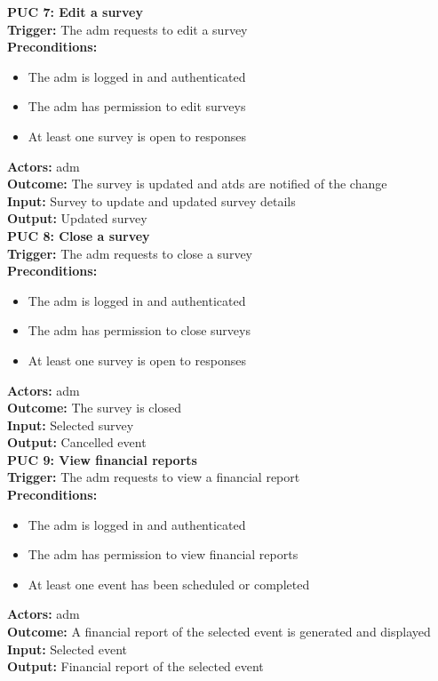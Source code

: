 \documentclass[12pt]{article}
\begin{document}
{\textbf{PUC 7: Edit a survey} \\
\textbf{Trigger:} The \gls{adm} requests to edit a survey \\
\textbf{Preconditions:}
\begin{itemize}
  \item The \gls{adm} is logged in and authenticated
  \item The \gls{adm} has permission to edit surveys
  \item At least one survey is open to responses
\end{itemize}
\textbf{Actors:} \Gls{adm} \\
\textbf{Outcome:} The survey is updated and \glspl{atd} are notified of the change \\
\textbf{Input:} Survey to update and              updated survey details \\
\textbf{Output:} Updated survey \\[1em]

\textbf{PUC 8: Close a survey} \\
\textbf{Trigger:} The \gls{adm} requests to close a survey \\
\textbf{Preconditions:}
\begin{itemize}
  \item The \gls{adm} is logged in and authenticated
  \item The \gls{adm} has permission to close surveys
  \item At least one survey is open to responses
\end{itemize}
\textbf{Actors:} \Gls{adm} \\
\textbf{Outcome:} The survey is closed \\
\textbf{Input:} Selected survey \\
\textbf{Output:} Cancelled event \\[1em]

\textbf{PUC 9: View financial reports} \\
\textbf{Trigger:} The \gls{adm} requests to view a financial report \\
\textbf{Preconditions:}
\begin{itemize}
  \item The \gls{adm} is logged in and authenticated
  \item The \gls{adm} has permission to view financial reports
  \item At least one event has been scheduled or completed
\end{itemize}
\textbf{Actors:} \Gls{adm} \\
\textbf{Outcome:} A financial report of the selected event is generated and displayed \\
\textbf{Input:} Selected event \\
\textbf{Output:} Financial report of the selected event \\[1em]

}
\end{document}
